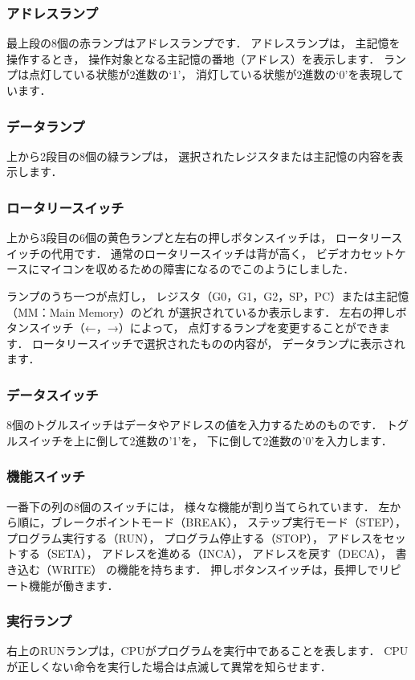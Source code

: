 \subsubsection{アドレスランプ}
最上段の8個の赤ランプはアドレスランプです．
アドレスランプは，
主記憶を操作するとき，
操作対象となる主記憶の番地（アドレス）を表示します．
ランプは点灯している状態が2進数の`1'，
消灯している状態が2進数の`0'を表現しています．

\subsubsection{データランプ}
上から2段目の8個の緑ランプは，
選択されたレジスタまたは主記憶の内容を表示します．

\subsubsection{ロータリースイッチ}
上から3段目の6個の黄色ランプと左右の押しボタンスイッチは，
ロータリースイッチの代用です．
通常のロータリースイッチは背が高く，
ビデオカセットケースにマイコンを収めるための障害になるのでこのようにしました．

ランプのうち一つが点灯し，
レジスタ（G0，G1，G2，SP，PC）または主記憶（MM：Main Memory）のどれ
が選択されているか表示します．
左右の押しボタンスイッチ（←，→）によって，
点灯するランプを変更することができます．
ロータリースイッチで選択されたものの内容が，
データランプに表示されます．

\subsubsection{データスイッチ}
8個のトグルスイッチはデータやアドレスの値を入力するためのものです．
トグルスイッチを上に倒して2進数の'1'を，
下に倒して2進数の'0'を入力します．

\subsubsection{機能スイッチ}
一番下の列の8個のスイッチには，
様々な機能が割り当てられています．
左から順に，ブレークポイントモード（BREAK），
ステップ実行モード（STEP），
プログラム実行する（RUN），
プログラム停止する（STOP），
アドレスをセットする（SETA），
アドレスを進める（INCA），
アドレスを戻す（DECA），
書き込む（WRITE）
の機能を持ちます．
押しボタンスイッチは，長押しでリピート機能が働きます．

\subsubsection{実行ランプ}
右上のRUNランプは，CPUがプログラムを実行中であることを表します．
CPUが正しくない命令を実行した場合は点滅して異常を知らせます．

